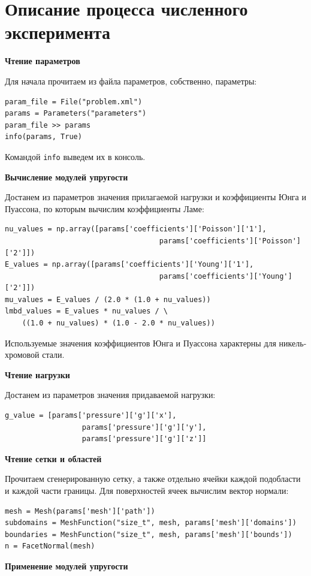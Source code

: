 \documentclass[a4paper, 14pt]{extreport}
\begin{document}
\section{Описание процесса численного эксперимента}

\textbf{Чтение параметров}

Для начала прочитаем из файла параметров, собственно, параметры:
\begin{lstlisting}
param_file = File("problem.xml")
params = Parameters("parameters")
param_file >> params
info(params, True)
\end{lstlisting}

Командой \texttt{info} выведем их в консоль. 

\textbf{Вычисление модулей упругости}

Достанем из параметров значения прилагаемой нагрузки и
коэффициенты Юнга и Пуассона, по которым вычислим коэффициенты Ламе:
\begin{lstlisting}
nu_values = np.array([params['coefficients']['Poisson']['1'],
                      				params['coefficients']['Poisson']['2']])
E_values = np.array([params['coefficients']['Young']['1'],
                     				params['coefficients']['Young']['2']])
mu_values = E_values / (2.0 * (1.0 + nu_values))
lmbd_values = E_values * nu_values / \
    ((1.0 + nu_values) * (1.0 - 2.0 * nu_values))
\end{lstlisting}
Используемые значения коэффициентов Юнга и Пуассона характерны для никель-хромовой стали.

\textbf{Чтение нагрузки}

Достанем из параметров значения придаваемой нагрузки:
\begin{lstlisting}
g_value = [params['pressure']['g']['x'],
           		  params['pressure']['g']['y'],
           	 	  params['pressure']['g']['z']]
\end{lstlisting}

\textbf{Чтение сетки и областей}

Прочитаем сгенерированную сетку, а также отдельно ячейки каждой подобласти и каждой части границы. Для поверхностей ячеек вычислим вектор нормали:
\begin{lstlisting}
mesh = Mesh(params['mesh']['path'])
subdomains = MeshFunction("size_t", mesh, params['mesh']['domains'])
boundaries = MeshFunction("size_t", mesh, params['mesh']['bounds'])
n = FacetNormal(mesh)
\end{lstlisting}

\textbf{Применение модулей упругости}
\end{document}

